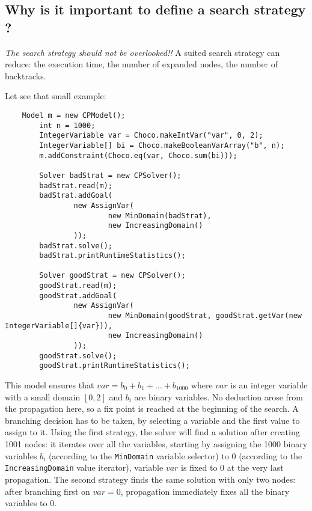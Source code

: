 \subsection{Why is it important to define a search strategy ?}\label{solver:whyisitimportanttodefineasearchstrategy}\hypertarget{solver:whyisitimportanttodefineasearchstrategy}{}

\begin{note}
\emph{The search strategy should not be overlooked!!}
A suited search strategy can reduce: the execution time, the number of expanded nodes, the number of backtracks.
\end{note}
Let see that small example:
\begin{lstlisting}
	Model m = new CPModel();
        int n = 1000;
        IntegerVariable var = Choco.makeIntVar("var", 0, 2);
        IntegerVariable[] bi = Choco.makeBooleanVarArray("b", n);
        m.addConstraint(Choco.eq(var, Choco.sum(bi)));

        Solver badStrat = new CPSolver();
        badStrat.read(m);
        badStrat.addGoal(
                new AssignVar(
                        new MinDomain(badStrat), 
                        new IncreasingDomain()
                ));
        badStrat.solve();
        badStrat.printRuntimeStatistics();

        Solver goodStrat = new CPSolver();
        goodStrat.read(m);
        goodStrat.addGoal(
                new AssignVar(
                        new MinDomain(goodStrat, goodStrat.getVar(new IntegerVariable[]{var})), 
                        new IncreasingDomain()
                ));
        goodStrat.solve();
        goodStrat.printRuntimeStatistics();
\end{lstlisting}

This model ensures that $var = b_{0} + b_{1} + \ldots + b_{1000}$ where $var$ is an integer variable with a small domain $[0,2]$ and $b_{i}$ are binary variables. No deduction arose from the propagation here, so a fix point is reached at the beginning of the search. A branching decision has to be taken, by selecting a variable and the first value to assign to it. Using the first strategy, the solver will find a solution after creating 1001 nodes: it iterates over all the variables, starting by assigning the 1000 binary variables $b_i$ (according to the \texttt{MinDomain} variable selector) to $0$ (according to the \texttt{IncreasingDomain} value iterator), variable $var$ is fixed to $0$ at the very last propagation. The second strategy finds the same solution with only two nodes: after branching first on $var=0$, propagation immediately fixes all the binary variables to $0$. 

